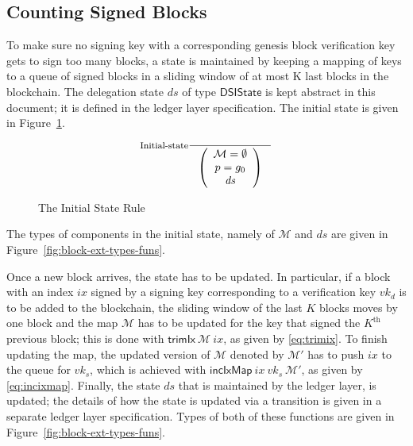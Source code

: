 \documentclass[11pt,a4paper]{article}
\newcommand{\var}[1]{\mathit{#1}}
\newcommand{\fun}[1]{\mathsf{#1}}
\newcommand{\type}[1]{\mathsf{#1}}
\newcommand{\DelegState}{\type{DSIState}}
\newcommand{\signmapname}{\mathcal{M}}
\newcommand{\trimixname}{trimIx}
\newcommand{\incixmapname}{incIxMap}
\newcommand{\trimix}[2]{\fun{\trimixname} ~ #1 ~ #2}
\newcommand{\incixmap}[3]{\fun{\incixmapname} ~ #1 ~ #2 ~ #3}
\begin{document}
\subsection{Counting Signed Blocks}
\label{sec:counting-signed-blocks}

To make sure no signing key with a corresponding genesis block verification
key gets to sign too many blocks, a state is maintained by keeping a mapping
of keys to a queue of signed blocks in a sliding window of at most K last
blocks in the blockchain.
%
The delegation state $ds$ of type $\DelegState$ is kept abstract in this
document;
%
it is defined in the ledger layer specification.
%
The initial state is given in Figure~\ref{fig:init-bc-state}.

\begin{figure}
  \begin{equation*}
    \inference[Initial-state]
    {}
    {\left(
        {\begin{array}{c}
           \signmapname = \emptyset \\
           p = g_0 \\
           \var{ds}
         \end{array}}
     \right)
   }
 \end{equation*}
 \caption{The Initial State Rule}
 \label{fig:init-bc-state}
\end{figure}

The types of components in the initial state, namely of $\fun{\signmapname}$
and $\var{ds}$ are given in Figure~\ref{fig:block-ext-types-funs}.

Once a new block arrives, the state has to be updated.
%
In particular, if a block with an index $\var{ix}$ signed by a signing key
corresponding to a verification key $\var{vk_d}$ is to be added to the
blockchain, the sliding window of the last $K$ blocks moves by one block and
the map $\fun{\signmapname}$ has to be updated for the key that signed the
$K^{\text{th}}$ previous block;
%
this is done with $\trimix{\signmapname}{\var{ix}}$, as given by
\eqref{eq:trimix}.
%
To finish updating the map, the updated version of $\signmapname$ denoted by
$\signmapname'$ has to push $\var{ix}$ to the queue for $\var{vk_s}$, which is
achieved with $\incixmap{\var{ix}}{\var{vk_s}}{\signmapname'}$, as given by
\eqref{eq:incixmap}.
%
Finally, the state $\var{ds}$ that is maintained by the ledger layer, is
updated; the details of how the state is updated via a transition is given in
a separate ledger layer specification.
%
Types of both of these functions are given in
Figure~\ref{fig:block-ext-types-funs}.
\end{document}

